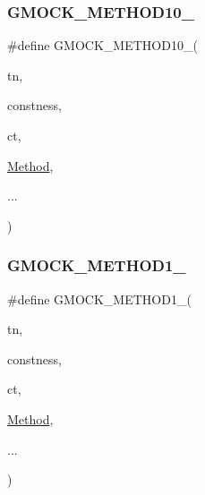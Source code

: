 \subsubsection{\texorpdfstring{G\+M\+O\+C\+K\+\_\+\+M\+E\+T\+H\+O\+D10\+\_\+}{GMOCK\_METHOD10\_}}
{\footnotesize\ttfamily \#define G\+M\+O\+C\+K\+\_\+\+M\+E\+T\+H\+O\+D10\+\_\+(\begin{DoxyParamCaption}\item[{}]{tn,  }\item[{}]{constness,  }\item[{}]{ct,  }\item[{}]{\hyperlink{gmock-spec-builders__test_8cc_a95606368148f3e5aab5db46c32466afd}{Method},  }\item[{}]{... }\end{DoxyParamCaption})}

\mbox{\label{gmock-generated-function-mockers_8h_a1bc0012d62440dda77208dabdf4925c9}} 
\subsubsection{\texorpdfstring{G\+M\+O\+C\+K\+\_\+\+M\+E\+T\+H\+O\+D1\+\_\+}{GMOCK\_METHOD1\_}}
{\footnotesize\ttfamily \#define G\+M\+O\+C\+K\+\_\+\+M\+E\+T\+H\+O\+D1\+\_\+(\begin{DoxyParamCaption}\item[{}]{tn,  }\item[{}]{constness,  }\item[{}]{ct,  }\item[{}]{\hyperlink{gmock-spec-builders__test_8cc_a95606368148f3e5aab5db46c32466afd}{Method},  }\item[{}]{... }\end{DoxyParamCaption})}

